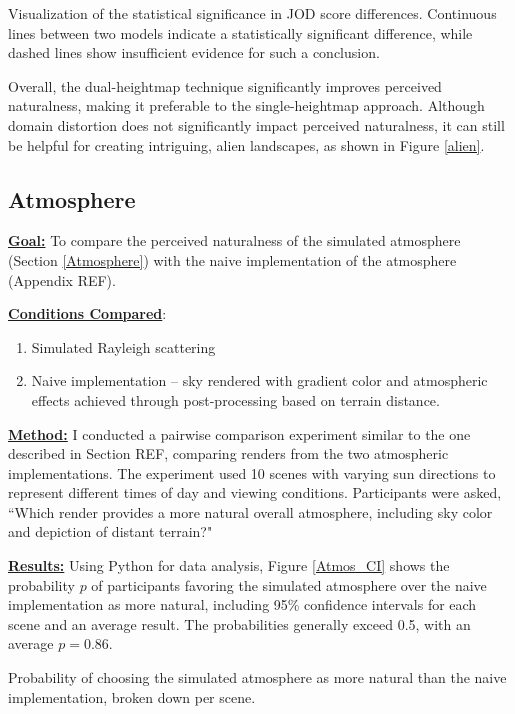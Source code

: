 {Visualization of the statistical significance in JOD score differences. Continuous lines between two models indicate a statistically significant difference, while dashed lines show insufficient evidence for such a conclusion.}

Overall, the dual-heightmap technique significantly improves perceived naturalness, making it preferable to the single-heightmap approach. Although domain distortion does not significantly impact perceived naturalness, it can still be helpful for creating intriguing, alien landscapes, as shown in  Figure \ref{alien}.

\subsection{Atmosphere}

\textbf{\underline{Goal:}} To compare the perceived naturalness of the simulated atmosphere (Section \ref{Atmosphere}) with the naive implementation of the atmosphere (Appendix REF).

\textbf{\underline{Conditions Compared}}: 
\begin{enumerate}
	\item Simulated Rayleigh scattering
	\item Naive implementation -- sky rendered with gradient color and atmospheric effects achieved through post-processing based on terrain distance.
\end{enumerate}

\textbf{\underline{Method:}}
I conducted a pairwise comparison experiment similar to the one described in Section REF, comparing renders from the two atmospheric implementations. The experiment used 10 scenes with varying sun directions to represent different times of day and viewing conditions. Participants were asked, ``Which render provides a more natural overall atmosphere, including sky color and depiction of distant terrain?"

\textbf{\underline{Results:}}
Using Python for data analysis, Figure \ref{Atmos_CI} shows the probability $p$ of participants favoring the simulated atmosphere over the naive implementation as more natural, including 95\% confidence intervals for each scene and an average result. The probabilities generally exceed 0.5, with an average $p = 0.86$.

{Probability of choosing the simulated atmosphere as more natural than the naive implementation, broken down per scene.}

